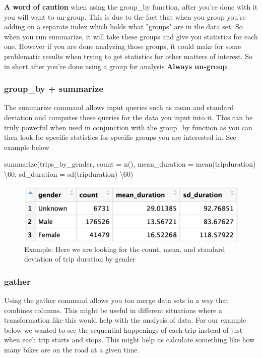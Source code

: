 \documentclass{article}
\begin{document}
\begin{flushleft}
\textbf{A word of caution} when using the group\_by function, after you're done with it you will want to un-group. This is due to the fact that when you group you're adding on a separate index which holds what "groups" are in the data set. So when you run summarize, it will take these groups and give you statistics for each one. However if you are done analyzing those groups, it could make for some problematic results when trying to get statistics for other matters of interest. So in short after you're done using a group for analysis \textbf{Always un-group}
\end{flushleft}

\subsubsection{group\_by + summarize}
\begin{flushleft}
The summarize command allows input queries such as mean and standard deviation and computes these queries for the data you input into it. This can be truly powerful when used in conjunction with the group\_by function as you can then look for specific statistics for specific groups you are interested in. 
See example below
\end{flushleft}

\begin{center}
summarize(trips\_by\_gender, count = n(), mean\_duration = mean(tripduration) \textbackslash 60, sd\_duration = sd(tripduration) \textbackslash 60)
\end{center}    

\begin{figure}[H]
    \centering
    \includegraphics[width=.75\textwidth]{group_and_summarize.png}
    \caption{Example: Here we are looking for the count, mean, and standard deviation of trip duration by gender }
    \label{fig:group_and_summarize}
\end{figure}


\subsubsection{gather}
\begin{flushleft}
Using the gather command allows you too merge data sets in a way that combines columns. This might be useful in different situations where a transformation like this would help with the analysis of data. For our example below we wanted to see the sequential happenings of each trip instead of just when each trip starts and stops. This might help us calculate something like how many bikes are on the road at a given time. 
\end{flushleft}
\end{document}
